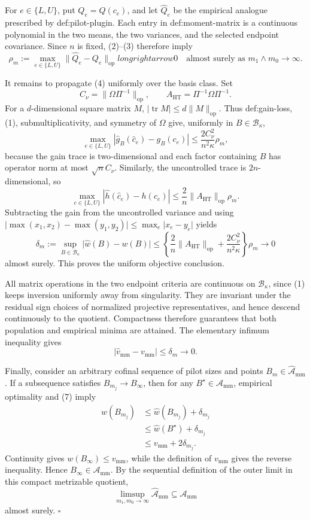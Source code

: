 For \(e\in\{L,U\}\), put \(Q_e=Q(c_e)\), and let \(\widehat Q_e\) be the empirical analogue prescribed by def:pilot-plugin.  Each entry in def:moment-matrix is a continuous polynomial in the two means, the two variances, and the selected endpoint covariance.  Since \(n\) is fixed, (2)--(3) therefore imply
\[
 \rho_m:=\max_{e\in\{L,U\}}
 \lVert\widehat Q_e-Q_e\rVert_{\mathrm{op}}longrightarrow0
 \quad\text{almost surely as }m_1\wedge m_0\to\infty.
 \tag{4}
\]

It remains to propagate (4) uniformly over the basis class.  Set
\[
 C_\nu=\lVert\Omega\Pi^{-1}\rVert_{\mathrm{op}},
 \qquad
 A_{\mathrm{HT}}=\Pi^{-1}\Omega\Pi^{-1}.
\]
For a \(d\)-dimensional square matrix \(M\), \(\lvert\operatorname{tr}M\rvert\le d\lVert M\rVert_{\mathrm{op}}\).  Thus def:gain-loss, (1), submultiplicativity, and symmetry of \(\Omega\) give, uniformly in \(B\in\mathcal B_\kappa\),
\[
 \max_{e\in\{L,U\}}
 \left\lvert\widehat g_B(\widehat c_e)-g_B(c_e)\right\rvert
 \le \frac{2C_\nu^2}{n^2\kappa}\rho_m,
 \tag{5}
\]
because the gain trace is two-dimensional and each factor containing \(B\) has operator norm at most \(\sqrt n C_\nu\).  Similarly, the uncontrolled trace is \(2n\)-dimensional, so
\[
 \max_{e\in\{L,U\}}
 \left\lvert\widehat h(\widehat c_e)-h(c_e)\right\rvert
 \le \frac{2}{n}\lVert A_{\mathrm{HT}}\rVert_{\mathrm{op}}\rho_m.
 \tag{6}
\]
Subtracting the gain from the uncontrolled variance and using
\(\lvert\max(x_1,x_2)-\max(y_1,y_2)\rvert\le\max_e\lvert x_e-y_e\rvert\) yields
\[
 \delta_m:=\sup_{B\in\mathcal B_\kappa}
 \lvert\widehat w(B)-w(B)\rvert
 \le
 \left\{
 \frac{2}{n}\lVert A_{\mathrm{HT}}\rVert_{\mathrm{op}}
 +\frac{2C_\nu^2}{n^2\kappa}
 \right\}\rho_m
 \longrightarrow0
 \tag{7}
\]
almost surely.  This proves the uniform objective conclusion.

All matrix operations in the two endpoint criteria are continuous on \(\mathcal B_\kappa\), since (1) keeps inversion uniformly away from singularity.  They are invariant under the residual sign choices of normalized projective representatives, and hence descend continuously to the quotient.  Compactness therefore guarantees that both population and empirical minima are attained.  The elementary infimum inequality gives
\[
 \left\lvert\widehat v_{\mathrm{mm}}-v_{\mathrm{mm}}\right\rvert
 \le\delta_m\longrightarrow0.
 \tag{8}
\]

Finally, consider an arbitrary cofinal sequence of pilot sizes and points \(B_m\in\widehat{\mathcal A}_{\mathrm{mm}}\).  If a subsequence satisfies \(B_{m_j}\to B_\infty\), then for any \(B^\star\in\mathcal A_{\mathrm{mm}}\), empirical optimality and (7) imply
\[
 \begin{aligned}
 w(B_{m_j})
 &\le \widehat w(B_{m_j})+\delta_{m_j}\\
 &\le \widehat w(B^\star)+\delta_{m_j}\\
 &\le v_{\mathrm{mm}}+2\delta_{m_j}.
 \end{aligned}
\]
Continuity gives \(w(B_\infty)\le v_{\mathrm{mm}}\), while the definition of \(v_{\mathrm{mm}}\) gives the reverse inequality.  Hence \(B_\infty\in\mathcal A_{\mathrm{mm}}\).  By the sequential definition of the outer limit in this compact metrizable quotient,
\[
 \limsup_{m_1,m_0\to\infty}\widehat{\mathcal A}_{\mathrm{mm}}
 \subseteq\mathcal A_{\mathrm{mm}}
\]
almost surely. \(\square\)